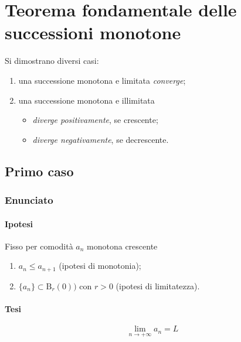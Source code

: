 \documentclass[../../dimostrazioni]{subfiles}
\begin{document}
    \chapter{Teorema fondamentale delle successioni monotone}
    \label{teoFondSuccMono}

        Si dimostrano diversi casi:
        \begin{enumerate}
            \indentitem \item una successione monotona e limitata \emph{converge};
            \indentitem \item una successione monotona e illimitata
                \begin{itemize}
                    \indentitem \item \emph{diverge positivamente}, se crescente;
                    \indentitem \item \emph{diverge negativamente}, se decrescente.
                \end{itemize}
        \end{enumerate}            


        \section*{Primo caso}
            
            \subsection*{Enunciato}
                
                \subsubsection*{Ipotesi}
                         
                Fisso per comodità \(a_n\) monotona crescente

                \begin{enumerate}
                    \indentitem \item \(a_n \leqslant a_{n+1}\) (ipotesi di monotonia);
                    \indentitem \item \(\{a_n\} \subset \mathrm{B}_r(0))\) con \(r > 0 \) (ipotesi di limitatezza).
                \end{enumerate}
                
                \subsubsection*{Tesi}
                    \[\lim_{n \to +\infty} a_n = L\]
            
\end{document}
